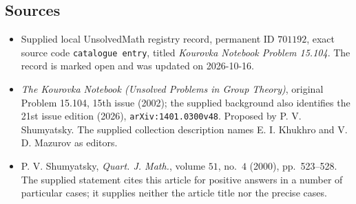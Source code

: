 \documentclass[11pt]{article}
\begin{document}
\subsection{Sources}
\begin{itemize}
\item Supplied local UnsolvedMath registry record, permanent ID \(701192\), exact source code \texttt{catalogue entry}, titled \emph{Kourovka Notebook Problem 15.104}. The record is marked open and was updated on 2026-10-16.
\item \emph{The Kourovka Notebook (Unsolved Problems in Group Theory)}, original Problem 15.104, 15th issue (2002); the supplied background also identifies the 21st issue edition (2026), \texttt{arXiv:1401.0300v48}. Proposed by P. V. Shumyatsky. The supplied collection description names E. I. Khukhro and V. D. Mazurov as editors.
\item P. V. Shumyatsky, \emph{Quart. J. Math.}, volume \(51\), no.\ \(4\) (2000), pp.\ 523--528. The supplied statement cites this article for positive answers in a number of particular cases; it supplies neither the article title nor the precise cases.
\end{itemize}
\end{document}
